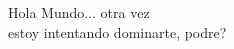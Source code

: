 \documentclass{article}
\begin{document}
Hola Mundo... otra vez\\
estoy intentando dominarte, podre?
\end{document}
